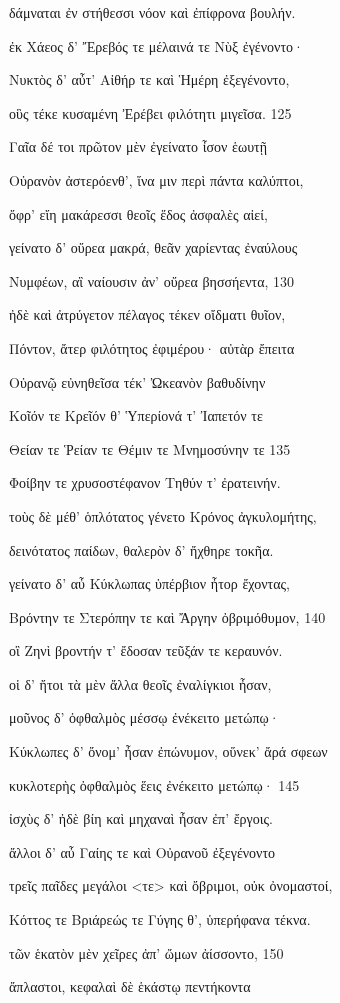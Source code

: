 δάμναται ἐν στήθεσσι νόον καὶ ἐπίφρονα βουλήν.

ἐκ Χάεος δ' Ἔρεβός τε μέλαινά τε Νὺξ ἐγένοντο· 

Νυκτὸς δ' αὖτ' Αἰθήρ τε καὶ Ἡμέρη ἐξεγένοντο,

οὓς τέκε κυσαμένη Ἐρέβει φιλότητι μιγεῖσα. \num{125}

Γαῖα δέ τοι πρῶτον μὲν ἐγείνατο ἶσον ἑωυτῇ

Οὐρανὸν ἀστερόενθ', ἵνα μιν περὶ πάντα καλύπτοι,

ὄφρ' εἴη μακάρεσσι θεοῖς ἕδος ἀσφαλὲς αἰεί,

γείνατο δ' οὔρεα μακρά, θεᾶν χαρίεντας ἐναύλους 

Νυμφέων, αἳ ναίουσιν ἀν' οὔρεα βησσήεντα, \num{130} 

ἠδὲ καὶ ἀτρύγετον πέλαγος τέκεν οἴδματι θυῖον,

Πόντον, ἄτερ φιλότητος ἐφιμέρου· αὐτὰρ ἔπειτα

Οὐρανῷ εὐνηθεῖσα τέκ' Ὠκεανὸν βαθυδίνην 

Κοῖόν τε Κρεῖόν θ' Ὑπερίονά τ' Ἰαπετόν τε

Θείαν τε Ῥείαν τε Θέμιν τε Μνημοσύνην τε \num{135}

Φοίβην τε χρυσοστέφανον Τηθύν τ' ἐρατεινήν.

τοὺς δὲ μέθ' ὁπλότατος γένετο Κρόνος ἀγκυλομήτης,

δεινότατος παίδων, θαλερὸν δ' ἤχθηρε τοκῆα. 

γείνατο δ' αὖ Κύκλωπας ὑπέρβιον ἦτορ ἔχοντας,

Βρόντην τε Στερόπην τε καὶ Ἄργην ὀβριμόθυμον, \num{140}

οἳ Ζηνὶ βροντήν τ' ἔδοσαν τεῦξάν τε κεραυνόν.

οἱ δ' ἤτοι τὰ μὲν ἄλλα θεοῖς ἐναλίγκιοι ἦσαν,

μοῦνος δ' ὀφθαλμὸς μέσσῳ ἐνέκειτο μετώπῳ· 

Κύκλωπες δ' ὄνομ' ἦσαν ἐπώνυμον, οὕνεκ' ἄρά σφεων

κυκλοτερὴς ὀφθαλμὸς ἕεις ἐνέκειτο μετώπῳ· \num{145}

ἰσχὺς δ' ἠδὲ βίη καὶ μηχαναὶ ἦσαν ἐπ' ἔργοις.

ἄλλοι δ' αὖ Γαίης τε καὶ Οὐρανοῦ ἐξεγένοντο

τρεῖς παῖδες μεγάλοι \textless{}τε\textgreater{} καὶ ὄβριμοι, οὐκ
ὀνομαστοί, 

Κόττος τε Βριάρεώς τε Γύγης θ', ὑπερήφανα τέκνα. 

τῶν ἑκατὸν μὲν χεῖρες ἀπ' ὤμων ἀίσσοντο, \num{150}

ἄπλαστοι, κεφαλαὶ δὲ ἑκάστῳ πεντήκοντα


